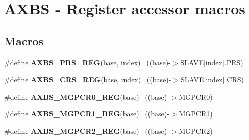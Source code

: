 \hypertarget{group___a_x_b_s___register___accessor___macros}{}\section{A\+X\+B\+S -\/ Register accessor macros}
\label{group___a_x_b_s___register___accessor___macros}
\subsection*{Macros}
\begin{DoxyCompactItemize}
\item 
\hypertarget{group___a_x_b_s___register___accessor___macros_gadfe35678a94e899b6b19386de08d3472}{}\#define {\bfseries A\+X\+B\+S\+\_\+\+P\+R\+S\+\_\+\+R\+E\+G}(base,  index)                              ~((base)-\/$>$S\+L\+A\+V\+E\mbox{[}index\mbox{]}.P\+R\+S)\label{group___a_x_b_s___register___accessor___macros_gadfe35678a94e899b6b19386de08d3472}

\item 
\hypertarget{group___a_x_b_s___register___accessor___macros_ga77c6588049d7ae23bbfd8c643a5adbed}{}\#define {\bfseries A\+X\+B\+S\+\_\+\+C\+R\+S\+\_\+\+R\+E\+G}(base,  index)                              ~((base)-\/$>$S\+L\+A\+V\+E\mbox{[}index\mbox{]}.C\+R\+S)\label{group___a_x_b_s___register___accessor___macros_ga77c6588049d7ae23bbfd8c643a5adbed}

\item 
\hypertarget{group___a_x_b_s___register___accessor___macros_ga73d5437b701295ca86a3c050a866cf37}{}\#define {\bfseries A\+X\+B\+S\+\_\+\+M\+G\+P\+C\+R0\+\_\+\+R\+E\+G}(base)                                    ~((base)-\/$>$M\+G\+P\+C\+R0)\label{group___a_x_b_s___register___accessor___macros_ga73d5437b701295ca86a3c050a866cf37}

\item 
\hypertarget{group___a_x_b_s___register___accessor___macros_gacbc3fc10e92190984302e2c4426afdd9}{}\#define {\bfseries A\+X\+B\+S\+\_\+\+M\+G\+P\+C\+R1\+\_\+\+R\+E\+G}(base)                                    ~((base)-\/$>$M\+G\+P\+C\+R1)\label{group___a_x_b_s___register___accessor___macros_gacbc3fc10e92190984302e2c4426afdd9}

\item 
\hypertarget{group___a_x_b_s___register___accessor___macros_gab08d4773427a7ffad127e4fc1c6cc024}{}\#define {\bfseries A\+X\+B\+S\+\_\+\+M\+G\+P\+C\+R2\+\_\+\+R\+E\+G}(base)                                    ~((base)-\/$>$M\+G\+P\+C\+R2)\label{group___a_x_b_s___register___accessor___macros_gab08d4773427a7ffad127e4fc1c6cc024}


\end{DoxyCompactItemize}
